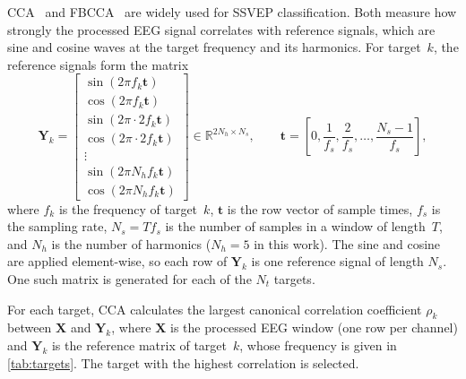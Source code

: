\ac{CCA}~\citep{lin2006cca} and \ac{FBCCA}~\citep{chen2015fbcca} are widely used for
\ac{SSVEP} classification. Both measure how strongly the processed \ac{EEG} signal correlates
with reference signals, which are sine and cosine waves at the target frequency and its
harmonics. For target~$k$, the reference signals form the matrix
\begin{equation}
    \mathbf{Y}_k =
    \begin{bmatrix}
        \sin(2\pi f_k \mathbf{t}) \\
        \cos(2\pi f_k \mathbf{t}) \\
        \sin(2\pi \cdot 2 f_k \mathbf{t}) \\
        \cos(2\pi \cdot 2 f_k \mathbf{t}) \\
        \vdots \\
        \sin(2\pi N_h f_k \mathbf{t}) \\
        \cos(2\pi N_h f_k \mathbf{t})
    \end{bmatrix}
    \in \mathbb{R}^{2N_h \times N_s},
    \qquad
    \mathbf{t} = \left[0, \frac{1}{f_s}, \frac{2}{f_s}, \dots, \frac{N_s - 1}{f_s}\right],
    \label{eq:cca-references}
\end{equation}
where $f_k$ is the frequency of target~$k$, $\mathbf{t}$ is the row vector of sample times,
$f_s$ is the sampling rate, $N_s = T f_s$ is the number of samples in a window of length~$T$,
and $N_h$ is the number of harmonics ($N_h = 5$ in this work). The sine and cosine are applied
element-wise, so each row of $\mathbf{Y}_k$ is one reference signal of length $N_s$.
One such matrix is generated for each of the $N_t$ targets.

For each target, \ac{CCA} calculates the largest canonical correlation coefficient $\rho_k$
between $\mathbf{X}$ and $\mathbf{Y}_k$, where $\mathbf{X}$ is the processed \ac{EEG} window
(one row per channel) and $\mathbf{Y}_k$ is the reference matrix of target~$k$, whose
frequency is given in \cref{tab:targets}. The target with the highest correlation is selected.

